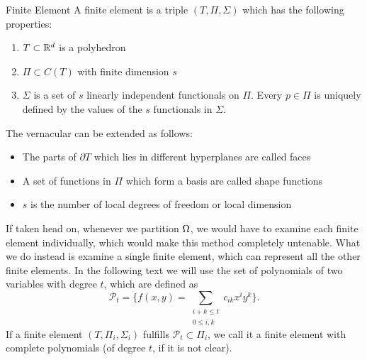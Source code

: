\begin{defn}{Finite Element}
    A finite element is a triple $(T, \Pi,\Sigma)$ which has the following properties:
    \label{def:finite_element}
    \begin{enumerate}
        \item $T\subset \mathbb{R}^d$ is a polyhedron
        \item $\Pi \subset C(T)$ with finite dimension $s$
        \item $\Sigma$ is a set of $s$ linearly independent functionals on $\Pi$. 
        Every $p\in \Pi$ is uniquely defined by the values of the $s$ functionals in $\Sigma$.
    \end{enumerate}
\end{defn}
The vernacular can be extended as follows:
\begin{itemize}
    \item The parts of $\partial T$ which lies in different hyperplanes are called faces
    \item A set of functions in $\Pi$ which form a basis are called shape functions 
    \item $s$ is the number of local degrees of freedom or local dimension
\end{itemize}
If taken head on, whenever we partition $\Omega$, we would have to examine 
each finite element individually, which would make this method completely 
untenable. What we do instead is examine a single finite element, which 
can represent all the other finite elements.
In the following text we will use the set of polynomials of two variables 
with degree $t$, which are defined as 
\begin{equation*}
\mathcal{P}_t = \{ f(x,y) = \sum_{\substack{i+k \leq t\\ 0\leq i,k}} c_{ik}x^i y^k \}.
\end{equation*}
If a finite element $(T, \Pi_i,\Sigma_i)$ fulfills 
    $\mathcal{P}_t \subset \Pi_i$,
we call it a finite element with complete polynomials (of degree $t$, if 
it is not clear).